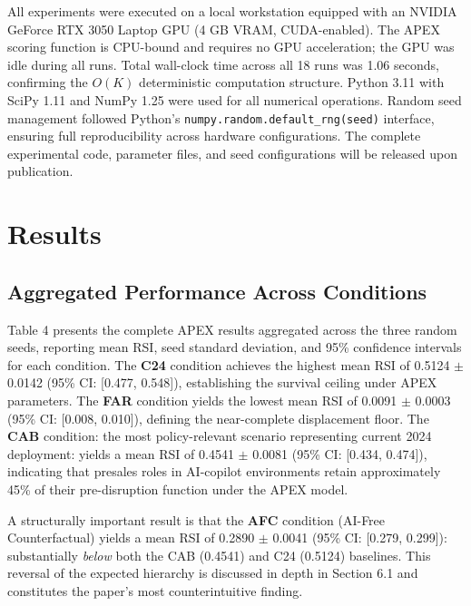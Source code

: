 \documentclass[10pt, conference]{IEEEtran}
\begin{document}
\label{sec:hardware_and_runtime}

All experiments were executed on a local workstation equipped with an NVIDIA GeForce RTX 3050 Laptop GPU (4 GB VRAM, CUDA-enabled). The APEX scoring function is CPU-bound and requires no GPU acceleration; the GPU was idle during all runs. Total wall-clock time across all 18 runs was 1.06 seconds, confirming the $O(K)$ deterministic computation structure. Python 3.11 with SciPy 1.11 \cite{virtanen2020scipy} and NumPy 1.25 were used for all numerical operations. Random seed management followed Python's \texttt{numpy.random.default\_rng(seed)} interface, ensuring full reproducibility across hardware configurations. The complete experimental code, parameter files, and seed configurations will be released upon publication.

\section{Results}

\label{sec:results}

\subsection{Aggregated Performance Across Conditions}

\label{sec:aggregated_performance_across_conditions}

Table 4 presents the complete APEX results aggregated across the three random seeds, reporting mean RSI, seed standard deviation, and 95\% confidence intervals for each condition. The \textbf{C24} condition achieves the highest mean RSI of 0.5124 $\pm$ 0.0142 (95\% CI: [0.477, 0.548]), establishing the survival ceiling under APEX parameters. The \textbf{FAR} condition yields the lowest mean RSI of 0.0091 $\pm$ 0.0003 (95\% CI: [0.008, 0.010]), defining the near-complete displacement floor. The \textbf{CAB} condition: the most policy-relevant scenario representing current 2024 deployment: yields a mean RSI of 0.4541 $\pm$ 0.0081 (95\% CI: [0.434, 0.474]), indicating that presales roles in AI-copilot environments retain approximately 45\% of their pre-disruption function under the APEX model.

A structurally important result is that the \textbf{AFC} condition (AI-Free Counterfactual) yields a mean RSI of 0.2890 $\pm$ 0.0041 (95\% CI: [0.279, 0.299]): substantially \textit{below} both the CAB (0.4541) and C24 (0.5124) baselines. This reversal of the expected hierarchy is discussed in depth in Section 6.1 and constitutes the paper's most counterintuitive finding.
\end{document}

